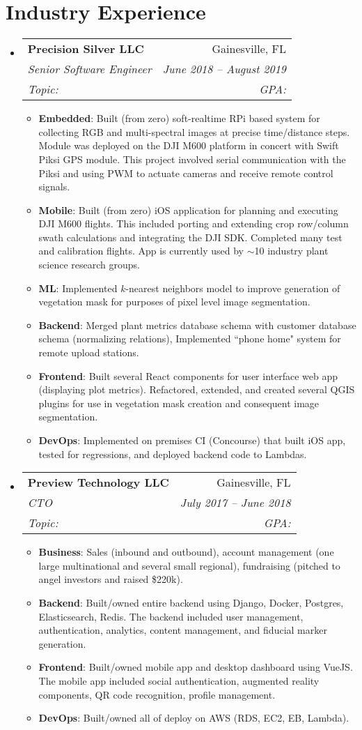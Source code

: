 \documentclass[letterpaper,11pt]{article}
\makeatletter
\newcommand{\resumeItem}[2]{
  \item\small{
    \textbf{#1}{#2 \vspace{-2pt}}
  }
}
\newcommand{\resumeSubheading}[6]{
  \vspace{-1pt}\item
    \begin{tabular*}{0.97\textwidth}{l@{\extracolsep{\fill}}r}
      \textbf{#1} & #2
      \ifthenelse{\equal{#3}{}}{}{
        \\ \textit{\small#3} & \textit{\small #4}
      } 
      \ifthenelse{\equal{#5}{}}{}{
        \\ \textit{\small Topic: #5}
      }
      \ifthenelse{\equal{#6}{}}{}{
         & \textit{\small GPA: #6}
      }
    \end{tabular*}\vspace{-5pt}
}
\newcommand{\resumeSubHeadingListStart}{\begin{itemize}[leftmargin=*]}
\newcommand{\resumeSubHeadingListEnd}{\end{itemize}}
\newcommand{\resumeItemListStart}{\begin{itemize}}
\newcommand{\resumeItemListEnd}{\end{itemize}\vspace{-5pt}}
\makeatother
\begin{document}
\section{Industry Experience}
  \resumeSubHeadingListStart
    \resumeSubheading
      {Precision Silver LLC}{Gainesville, FL}
      {Senior Software Engineer}{June 2018 -- August 2019}{}{}
      \resumeItemListStart
        \resumeItem{Embedded}
          {: Built (from zero) soft-realtime RPi based system for collecting RGB and multi-spectral images at precise time/distance steps. Module was deployed on the DJI M600 platform in concert with Swift Piksi GPS module. This project involved serial communication with the Piksi and using PWM to actuate cameras and receive remote control signals.}
        \resumeItem{Mobile}
          {: Built (from zero) iOS application for planning and executing DJI M600 flights. This included porting and extending crop row/column swath calculations and integrating the DJI SDK. Completed many test and calibration flights. App is currently used by \(\sim\)10 industry plant science research groups.}
        \resumeItem{ML}
          {: Implemented \(k\)-nearest neighbors model to improve generation of vegetation mask for purposes of pixel level image segmentation.}
        \resumeItem{Backend}
          {: Merged plant metrics database schema with customer database schema (normalizing relations), Implemented ``phone home" system for remote upload stations.}
        \resumeItem{Frontend}
          {: Built several React components for user interface web app (displaying plot metrics). Refactored, extended, and created several QGIS plugins for use in vegetation mask creation and consequent image segmentation.}
        \resumeItem{DevOps}
          {: Implemented on premises CI (Concourse) that built iOS app, tested for regressions, and deployed backend code to Lambdas.}
      \resumeItemListEnd
    \resumeSubheading
      {Preview Technology LLC}{Gainesville, FL}
      {CTO}{July 2017 -- June 2018}{}{}
      \resumeItemListStart
        \resumeItem{Business}
          {: Sales (inbound and outbound), account management (one large multinational and several small regional), fundraising (pitched to angel investors and raised \$220k).}
        \resumeItem{Backend}
          {: Built/owned entire backend using Django, Docker, Postgres, Elasticsearch, Redis. The backend included user management, authentication, analytics, content management, and fiducial marker generation.}
        \resumeItem{Frontend}
          {: Built/owned mobile app and desktop dashboard using VueJS. The mobile app included social authentication, augmented reality components, QR code recognition, profile management.}
        \resumeItem{DevOps}
          {: Built/owned all of deploy on AWS (RDS, EC2, EB, Lambda).}
      \resumeItemListEnd
    \resumeSubHeadingListEnd
\end{document}
